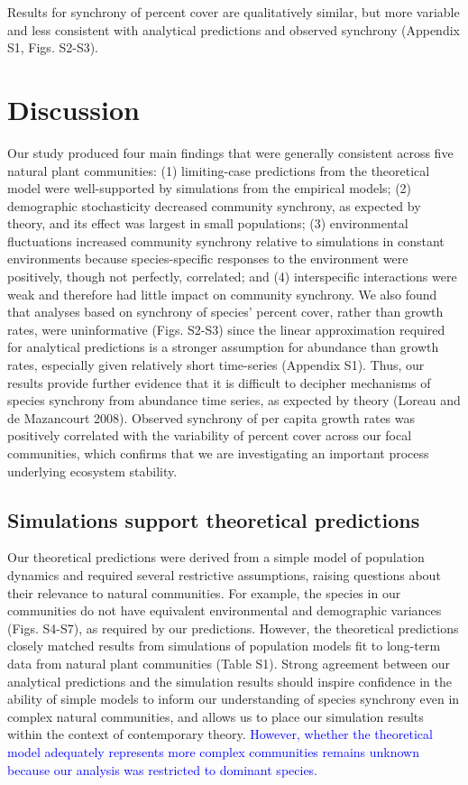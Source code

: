 \documentclass[11pt,]{article}
\begin{document}
Results for synchrony of percent cover are qualitatively similar, but
more variable and less consistent with analytical predictions and
observed synchrony (Appendix S1, Figs. S2-S3).

\section{Discussion}

Our study produced four main findings that were generally consistent
across five natural plant communities: (1) limiting-case predictions
from the theoretical model were well-supported by simulations from the
empirical models; (2) demographic stochasticity decreased community
synchrony, as expected by theory, and its effect was largest in small
populations; (3) environmental fluctuations increased community
synchrony relative to simulations in constant environments because
species-specific responses to the environment were positively, though
not perfectly, correlated; and (4) interspecific interactions were weak
and therefore had little impact on community synchrony. We also found
that analyses based on synchrony of species' percent cover, rather than
growth rates, were uninformative (Figs. S2-S3) since the linear
approximation required for analytical predictions is a stronger
assumption for abundance than growth rates, especially given relatively
short time-series (Appendix S1). Thus, our results provide further
evidence that it is difficult to decipher mechanisms of species
synchrony from abundance time series, as expected by theory (Loreau and
{{de Mazancourt}} 2008). Observed synchrony of per capita growth rates
was positively correlated with the variability of percent cover across
our focal communities, which confirms that we are investigating an
important process underlying ecosystem stability.

\subsection{Simulations support theoretical predictions}

Our theoretical predictions were derived from a simple model of
population dynamics and required several restrictive assumptions,
raising questions about their relevance to natural communities. For
example, the species in our communities do not have equivalent
environmental and demographic variances (Figs. S4-S7), as required by
our predictions. However, the theoretical predictions closely matched
results from simulations of population models fit to long-term data from
natural plant communities (Table S1). Strong agreement between our
analytical predictions and the simulation results should inspire
confidence in the ability of simple models to inform our understanding
of species synchrony even in complex natural communities, and allows us
to place our simulation results within the context of contemporary
theory.
\textcolor{blue}{However, whether the theoretical model adequately represents more complex communities remains unknown because our analysis was restricted to dominant species.}
\end{document}

